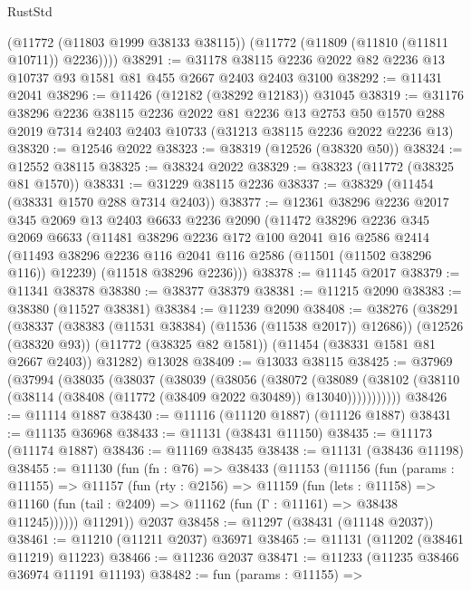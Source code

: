 \begin{lexlean}{RustStd}
\begin{coremodule}
        (@11772 (@11803 @1999 @38133 @38115))
        (@11772 (@11809 (@11810 (@11811 @10711)) @2236))))
@38291 := @31178 @38115 @2236 @2022 @82 @2236 @13 @10737 @93 @1581 @81 @455 @2667 @2403 @2403 @3100
@38292 := @11431 @2041
@38296 := @11426 (@12182 (@38292 @12183)) @31045
@38319 := @31176
    @38296
    @2236
    @38115
    @2236
    @2022
    @81
    @2236
    @13
    @2753
    @50
    @1570
    @288
    @2019
    @7314
    @2403
    @2403
    @10733
    (@31213 @38115 @2236 @2022 @2236 @13)
@38320 := @12546 @2022
@38323 := @38319 (@12526 (@38320 @50))
@38324 := @12552 @38115
@38325 := @38324 @2022
@38329 := @38323 (@11772 (@38325 @81 @1570))
@38331 := @31229 @38115 @2236
@38337 := @38329 (@11454 (@38331 @1570 @288 @7314 @2403))
@38377 := @12361
    @38296
    @2236
    @2017
    @345
    @2069
    @13
    @2403
    @6633
    @2236
    @2090
    (@11472
      @38296
      @2236
      @345
      @2069
      @6633
      (@11481
        @38296
        @2236
        @172
        @100
        @2041
        @16
        @2586
        @2414
        (@11493 @38296 @2236 @116 @2041 @116 @2586 (@11501 (@11502 @38296 @116)) @12239)
        (@11518 @38296 @2236)))
@38378 := @11145 @2017
@38379 := @11341 @38378
@38380 := @38377 @38379
@38381 := @11215 @2090
@38383 := @38380 (@11527 @38381)
@38384 := @11239 @2090
@38408 := @38276
    (@38291
      (@38337 (@38383 (@11531 @38384) (@11536 (@11538 @2017)) @12686))
      (@12526 (@38320 @93))
      (@11772 (@38325 @82 @1581))
      (@11454 (@38331 @1581 @81 @2667 @2403))
      @31282)
    @13028
@38409 := @13033 @38115
@38425 := @37969
    (@37994
      (@38035
        (@38037
          (@38039
            (@38056
              (@38072
                (@38089
                  (@38102 (@38110 (@38114 (@38408 (@11772 (@38409 @2022 @30489)) @13040)))))))))))
@38426 := @11114 @1887
@38430 := @11116 (@11120 @1887) (@11126 @1887)
@38431 := @11135 @36968
@38433 := @11131 (@38431 @11150)
@38435 := @11173 (@11174 @1887)
@38436 := @11169 @38435
@38438 := @11131 (@38436 @11198)
@38455 := @11130
    (fun (fn : @76) =>
    @38433
      (@11153
        (@11156
          (fun (params : @11155) =>
          @11157
            (fun (rty : @2156) =>
            @11159
              (fun (lets : @11158) =>
              @11160 (fun (tail : @2409) => @11162 (fun (Γ : @11161) => @38438 @11245))))))
        @11291))
    @2037
@38458 := @11297 (@38431 (@11148 @2037))
@38461 := @11210 (@11211 @2037) @36971
@38465 := @11131 (@11202 (@38461 @11219) @11223)
@38466 := @11236 @2037
@38471 := @11233 (@11235 @38466 @36974 @11191 @11193)
@38482 := fun (params : @11155) =>

\end{coremodule}
\end{lexlean}

